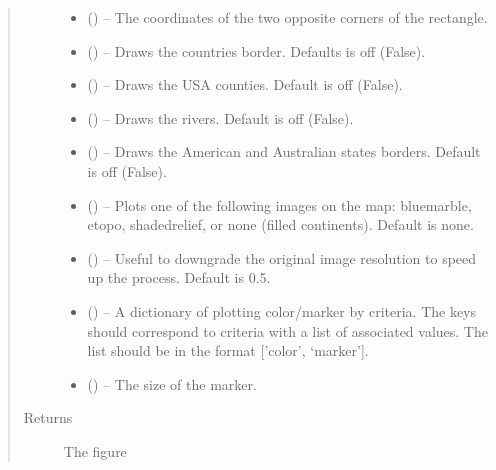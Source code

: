 \documentclass[letterpaper,10pt,english]{sphinxmanual}
\begin{document}
\begin{fulllineitems}
\begin{quote}
\begin{description}
\begin{itemize}
\item {} 
\sphinxstyleliteralstrong{, }\sphinxstyleliteralstrong{, } (\sphinxstyleliteralemphasis{,}\sphinxstyleliteralemphasis{}) -- The coordinates
of the two opposite corners of the rectangle.

\item {} 
 () -- Draws the countries border. Defaults is off (False).

\item {} 
 () -- Draws the USA counties. Default is off (False).

\item {} 
 () -- Draws the rivers. Default is off (False).

\item {} 
 () -- Draws the American and Australian states borders.
Default is off (False).

\item {} 
 () -- Plots one of the following images on the map:
bluemarble, etopo, shadedrelief, or none (filled continents).
Default is none.

\item {} 
 () -- Useful to downgrade the original image resolution to
speed up the process. Default is 0.5.

\item {} 
 () -- A dictionary of plotting color/marker by criteria. The
keys should correspond to  criteria with a list of
associated values. The list should be in the format
{[}'color', `marker'{]}.

\item {} 
 () -- The size of the marker.

\end{itemize}

\item[{Returns}] \leavevmode
The figure

\end{description}\end{quote}

\end{fulllineitems}
\end{document}
